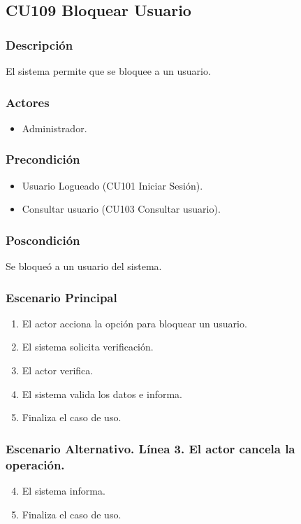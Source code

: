 \subsection{CU109 Bloquear Usuario}
\subsubsection{Descripci\'{o}n}
El sistema permite que se bloquee a un usuario.
\subsubsection{Actores}
\begin{itemize}
\item Administrador.
\end{itemize}
\subsubsection{Precondici\'{o}n}
\begin{itemize}
\item Usuario Logueado (CU101 Iniciar Sesi\'{o}n).
\item Consultar usuario (CU103 Consultar usuario).
\end{itemize}
\subsubsection{Poscondici\'{o}n}
Se bloque\'{o} a un usuario del sistema.
\subsubsection{Escenario Principal}
\begin{enumerate}
\item El actor acciona la opci\'{o}n para bloquear un usuario.
\item El sistema solicita verificaci\'{o}n.
\item El actor verifica.
\item El sistema valida los datos e informa.
\item Finaliza el caso de uso.
\end{enumerate}
\subsubsection{Escenario Alternativo. L\'{i}nea 3. El actor cancela la operaci\'{o}n.}
\begin{enumerate}
\setcounter{enumi}{3}
\item El sistema informa.
\item Finaliza el caso de uso.
\end{enumerate}